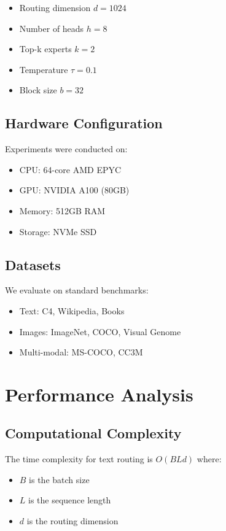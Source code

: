 \documentclass[10pt,journal,compsoc]{IEEEtran}
\begin{document}
\begin{itemize}
    \item Routing dimension $d = 1024$
    \item Number of heads $h = 8$
    \item Top-k experts $k = 2$
    \item Temperature $\tau = 0.1$
    \item Block size $b = 32$
\end{itemize}

\subsection{Hardware Configuration}
Experiments were conducted on:
\begin{itemize}
    \item CPU: 64-core AMD EPYC
    \item GPU: NVIDIA A100 (80GB)
    \item Memory: 512GB RAM
    \item Storage: NVMe SSD
\end{itemize}

\subsection{Datasets}
We evaluate on standard benchmarks:
\begin{itemize}
    \item Text: C4, Wikipedia, Books
    \item Images: ImageNet, COCO, Visual Genome
    \item Multi-modal: MS-COCO, CC3M
\end{itemize}

\section{Performance Analysis}
\subsection{Computational Complexity}
The time complexity for text routing is $O(BLd)$ where:
\begin{itemize}
    \item $B$ is the batch size
    \item $L$ is the sequence length
    \item $d$ is the routing dimension
\end{itemize}
\end{document}
